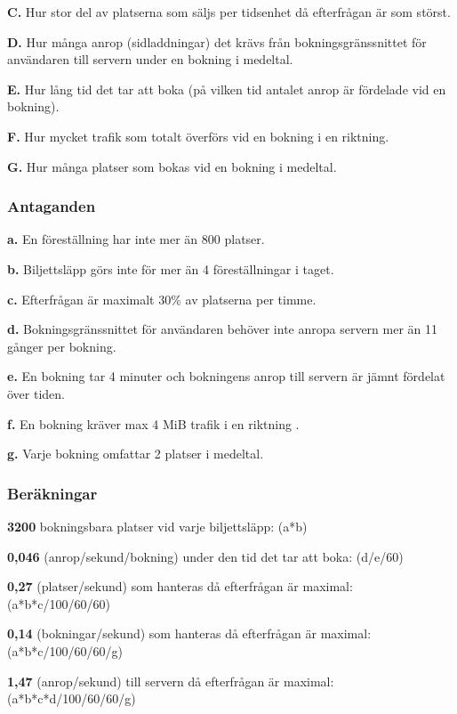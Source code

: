 \documentclass[a4paper, twoside, 11pt, titlepage]{article}
\begin{document}
		\textbf{C.} Hur stor del av platserna som säljs per tidsenhet då efterfrågan är som störst.

		\textbf{D.} Hur många anrop (sidladdningar) det krävs från bokningsgränssnittet för användaren till servern under en bokning i medeltal.

		\textbf{E.} Hur lång tid det tar att boka (på vilken tid antalet anrop är fördelade vid en bokning).

		\textbf{F.} Hur mycket trafik som totalt överförs vid en bokning i en riktning.

		\textbf{G.} Hur många platser som bokas vid en bokning i medeltal.

		\subsubsection{Antaganden}


		\textbf{a.} En föreställning har inte mer än 800 platser.

		\textbf{b.} Biljettsläpp görs inte för mer än 4 föreställningar i taget.

		\textbf{c.} Efterfrågan är maximalt 30\% av platserna per timme.

		\textbf{d.} Bokningsgränssnittet för användaren behöver inte anropa servern mer än 11 gånger per bokning.

		\textbf{e.} En bokning tar 4 minuter och bokningens anrop till servern är jämnt fördelat över tiden.

		\textbf{f.} En bokning kräver max 4 MiB trafik i en riktning .

		\textbf{g.} Varje bokning omfattar 2 platser i medeltal.

		\subsubsection{Beräkningar}


		\textbf{3200} bokningsbara platser vid varje biljettsläpp: (a*b)

		\textbf{0,046} (anrop/sekund/bokning) under den tid det tar att boka: (d/e/60)

		\textbf{0,27} (platser/sekund) som hanteras då efterfrågan är maximal: (a*b*c/100/60/60)

		\textbf{0,14} (bokningar/sekund) som hanteras då efterfrågan är maximal: (a*b*c/100/60/60/g)

		\textbf{1,47} (anrop/sekund) till servern då efterfrågan är maximal: (a*b*c*d/100/60/60/g)
\end{document}
